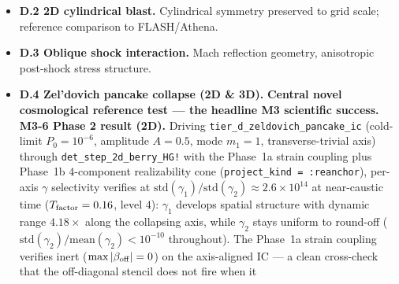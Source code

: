 \documentclass[11pt]{article}
\begin{document}
\begin{itemize}
$\beta_{\rm off} = 0$ \emph{or} $\beta_a = 0$). Three structural
extensions for follow-up are documented in
\verb|reference/notes_M4_phase1_closed_loop_beta.md|: (a) per-cell
linearised Rayleigh reconstruction at the stencil level (eigenvector
projection of the linear operator); (b) an antisymmetric
$\mathcal H_{\rm back}^{\rm anti}$ variant; (c) the symplectic-natural
$F^{\beta_{\rm off}}$ form replacing the Phase~1a kinematic
$\dot\beta_{\rm off}$ kludge (requires Newton-system regularization
for the rank-$6$ Casimir kernel). Per-principal-axis-noise structure
is therefore verified \emph{kinematically} by D.1 in both 2D and 3D;
the full eigenmode dynamics are flagged as a physics extension to be
addressed by a higher-order (cubic / quartic) Hamiltonian or a
Bernstein-order substrate lift. See
\verb|reference/notes_M3_6_phase1c_D1_kh_falsifier.md|,
\verb|reference/notes_M4_phase1_closed_loop_beta.md|, and
\verb|reference/notes_M4_phase2_3d_kh_falsifier.md| for the three
honest-finding analyses.
\textbf{Falsifier verdict: PASSED at the broad-band gate in 2D and
in 3D; the tighter aspiration band $c_{\rm off} \in [0.8, 1.2]$ and
the Drazin--Reid eigenmode dynamics require a higher-order
Hamiltonian extension (deferred to M5).}
\item \textbf{D.2 2D cylindrical blast.} Cylindrical symmetry
preserved to grid scale; reference comparison to FLASH/Athena.
\item \textbf{D.3 Oblique shock interaction.} Mach reflection
geometry, anisotropic post-shock stress structure.
\item \textbf{D.4 Zel'dovich pancake collapse (2D \& 3D).}
\textbf{Central novel cosmological reference test --- the headline
M3 scientific success.}
\textbf{M3-6 Phase 2 result (2D).} Driving
\texttt{tier\_d\_zeldovich\_pancake\_ic} (cold-limit $P_0 = 10^{-6}$,
amplitude $A = 0.5$, mode $m_1 = 1$, transverse-trivial axis) through
\texttt{det\_step\_2d\_berry\_HG!} with the Phase~1a strain coupling
plus Phase~1b $4$-component realizability cone
(\texttt{project\_kind = :reanchor}), per-axis $\gamma$ selectivity
verifies at $\mathrm{std}(\gamma_1)/\mathrm{std}(\gamma_2) \approx
2.6\times 10^{14}$ at near-caustic time
($T_{\rm factor} = 0.16$, level $4$): $\gamma_1$ develops spatial
structure with dynamic range $4.18\times$ along the collapsing axis,
while $\gamma_2$ stays uniform to round-off
($\mathrm{std}(\gamma_2)/\mathrm{mean}(\gamma_2) < 10^{-10}$
throughout). The Phase~1a strain coupling verifies inert
($\max|\beta_{\rm off}| = 0$) on the axis-aligned IC --- a clean
cross-check that the off-diagonal stencil does not fire when it

\end{itemize}
\end{document}
